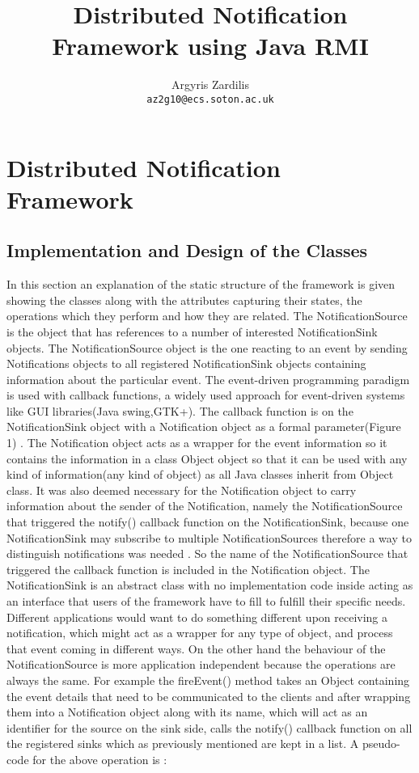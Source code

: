 \documentclass[a4paper,12pt,titlepage]{article}
\author{Argyris Zardilis\\ \texttt{az2g10@ecs.soton.ac.uk}}
\title{Distributed Notification Framework using Java RMI}
\begin{document}
\maketitle
\section{Distributed Notification Framework}
\subsection{Implementation and Design of the Classes}
In this section an explanation of the static structure of the framework is given showing the classes along with the attributes capturing their states, the operations which they perform and how they are related. The NotificationSource  is the object that has references to a number of interested NotificationSink objects. The NotificationSource object is the one reacting to an event by sending Notifications objects to all registered NotificationSink objects containing information about the particular event. The event-driven programming paradigm is used with callback functions, a widely used approach for event-driven systems like GUI libraries(Java swing,GTK+). The callback function is on the NotificationSink object with a Notification object as a formal parameter(Figure 1) . The Notification object acts as a wrapper for the event information so it contains the information in a class Object object so that it can be used with any kind of information(any kind of object) as all Java classes inherit from Object class. It was also deemed necessary for the Notification object to carry information about the sender of the Notification, namely the NotificationSource that triggered the notify() callback function on the NotificationSink, because one NotificationSink may subscribe to multiple NotificationSources therefore a way to distinguish notifications was needed . So the name of the NotificationSource that triggered the callback function is included in the Notification object. The NotificationSink is an abstract class with no implementation code inside acting as an interface that users of the framework have to fill to fulfill their specific needs. Different applications would want to do something different upon receiving a notification, which might act as a wrapper for any type of object, and process that event coming in different ways. On the other hand the behaviour of the NotificationSource is more application independent because the operations are always the same. For example the fireEvent() method takes an Object containing the event details that need to be communicated to the clients and after wrapping them into a Notification object along with its name, which will act as an identifier for the source on the sink side, calls the notify() callback function on all the registered sinks which as previously mentioned are kept in a list. A pseudo-code for the above operation is : \\
\end{document}
